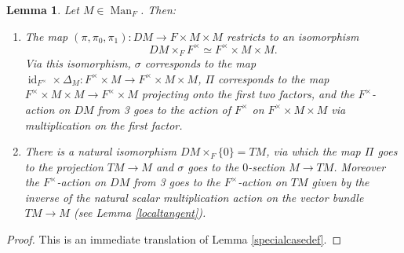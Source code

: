 \documentclass[12pt]{article}
\newtheorem{lemma}[theorem]{Lemma}
\begin{document}
\begin{lemma}\label{specialdefgeom}
Let $M\in\operatorname{Man}_F$.  Then:
\begin{enumerate}
\item The map $(\pi,\pi_0,\pi_1):DM\rightarrow F\times M\times M$ restricts to an isomorphism
$$DM\times_F F^\times \simeq F^\times \times M\times M.$$
Via this isomorphism, $\sigma$ corresponds to the map $\operatorname{id}_{F^\times}\times \Delta_M:F^\times \times M\rightarrow F^\times \times M\times M$, $\Pi$ corresponds to the map $F^\times \times M\times M\rightarrow F^\times \times M$ projecting onto the first two factors, and the $F^\times$-action on $DM$ from 3 goes to the action of $F^\times$ on $F^\times \times M\times M$ via multiplication on the first factor.
\item There is a natural isomorphism $DM\times_F \{0\} = TM$, via which the map $\Pi$ goes to the projection $TM\rightarrow M$ and $\sigma$ goes to the $0$-section $M\rightarrow TM$.  Moreover the $F^\times$-action on $DM$ from 3 goes to the $F^\times$-action on $TM$ given by the \emph{inverse} of the natural scalar multiplication action on the vector bundle $TM\rightarrow M$ (see Lemma \ref{localtangent}).
\end{enumerate}
\end{lemma}
\begin{proof}
This is an immediate translation of Lemma \ref{specialcasedef}.
\end{proof}
\end{document}
